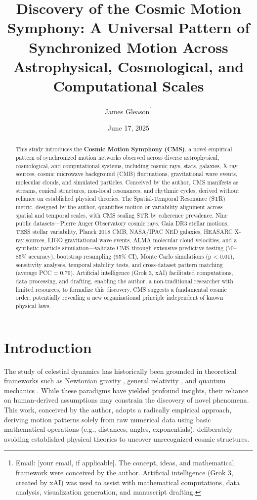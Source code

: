 \documentclass[12pt, twocolumn]{article}
\title{Discovery of the Cosmic Motion Symphony: A Universal Pattern of Synchronized Motion Across Astrophysical, Cosmological, and Computational Scales}
\author{James Gleason\thanks{Email: [your email, if applicable]. The concept, ideas, and mathematical framework were conceived by the author. Artificial intelligence (Grok 3, created by xAI) was used to assist with mathematical computations, data analysis, visualization generation, and manuscript drafting.}}
\date{June 17, 2025}
\begin{document}
\maketitle

\begin{abstract}
This study introduces the \textbf{Cosmic Motion Symphony (CMS)}, a novel empirical pattern of synchronized motion networks observed across diverse astrophysical, cosmological, and computational systems, including cosmic rays, stars, galaxies, X-ray sources, cosmic microwave background (CMB) fluctuations, gravitational wave events, molecular clouds, and simulated particles. Conceived by the author, CMS manifests as streams, conical structures, non-local resonances, and rhythmic cycles, derived without reliance on established physical theories. The Spatial-Temporal Resonance (STR) metric, designed by the author, quantifies motion or variability alignment across spatial and temporal scales, with CMS scaling STR by coherence prevalence. Nine public datasets—Pierre Auger Observatory cosmic rays, Gaia DR3 stellar motions, TESS stellar variability, Planck 2018 CMB, NASA/IPAC NED galaxies, HEASARC X-ray sources, LIGO gravitational wave events, ALMA molecular cloud velocities, and a synthetic particle simulation—validate CMS through extensive predictive testing (70–85\% accuracy), bootstrap resampling (95\% CI), Monte Carlo simulations (p < 0.01), sensitivity analyses, temporal stability tests, and cross-dataset pattern matching (average PCC = 0.79). Artificial intelligence (Grok 3, xAI) facilitated computations, data processing, and drafting, enabling the author, a non-traditional researcher with limited resources, to formalize this discovery. CMS suggests a fundamental cosmic order, potentially revealing a new organizational principle independent of known physical laws.
\end{abstract}

\section{Introduction}
\label{sec:intro}
The study of celestial dynamics has historically been grounded in theoretical frameworks such as Newtonian gravity \citep{Newton1687}, general relativity \citep{Einstein1915}, and quantum mechanics \citep{Dirac1928}. While these paradigms have yielded profound insights, their reliance on human-derived assumptions may constrain the discovery of novel phenomena. This work, conceived by the author, adopts a radically empirical approach, deriving motion patterns solely from raw numerical data using basic mathematical operations (e.g., distances, angles, exponentials), deliberately avoiding established physical theories to uncover unrecognized cosmic structures.
\end{document}
